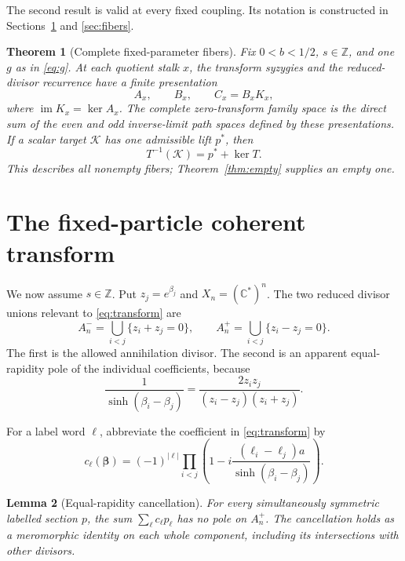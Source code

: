 \documentclass[11pt,reqno]{amsart}
\newtheorem{theorem}{Theorem}[section]
\newtheorem{lemma}[theorem]{Lemma}
\theoremstyle{definition}
\theoremstyle{remark}
\newcommand{\C}{\mathbb C}
\newcommand{\Z}{\mathbb Z}
\newcommand{\cK}{\mathcal K}
\newcommand{\im}{\operatorname{im}}
\begin{document}
The second result is valid at every fixed coupling.  Its notation is
constructed in Sections~\ref{sec:fixed} and \ref{sec:fibers}.

\begin{theorem}[Complete fixed-parameter fibers]
\label{thm:fibers-intro}
Fix $0<b<1/2$, $s\in\Z$, and one $g$ as in \eqref{eq:g}.  At each quotient
stalk $x$, the transform syzygies and the reduced-divisor recurrence have a
finite presentation
\begin{equation}
 A_x,\qquad B_x,\qquad C_x=B_xK_x,
 \label{eq:ABC-intro}
\end{equation}
where $\im K_x=\ker A_x$.  The complete zero-transform family space is the
direct sum of the even and odd inverse-limit path spaces defined by these
presentations.  If a scalar target $\cK$ has one admissible lift $p^*$, then
\begin{equation}
 T^{-1}(\cK)=p^*+\ker T.
 \label{eq:affine-intro}
\end{equation}
This describes all nonempty fibers; Theorem~\ref{thm:empty} supplies an empty
one.
\end{theorem}

\section{The fixed-particle coherent transform}
\label{sec:fixed}

We now assume $s\in\Z$.  Put $z_j=e^{\beta_j}$ and
$X_n=(\C^*)^n$.  The two reduced divisor unions relevant to
\eqref{eq:transform} are
\begin{equation}
 A_n^- =\bigcup_{i<j}\{z_i+z_j=0\},
 \qquad
 A_n^+ =\bigcup_{i<j}\{z_i-z_j=0\}.
 \label{eq:divisors}
\end{equation}
The first is the allowed annihilation divisor.  The second is an apparent
equal-rapidity pole of the individual coefficients, because
\begin{equation}
 \frac1{\sinh(\beta_i-\beta_j)}
 =\frac{2z_iz_j}{(z_i-z_j)(z_i+z_j)}.
 \label{eq:sinh-z}
\end{equation}

For a label word $\boldsymbol\ell$, abbreviate the coefficient in
\eqref{eq:transform} by
\begin{equation}
 c_{\boldsymbol\ell}(\boldsymbol\beta)
 =(-1)^{|\boldsymbol\ell|}
 \prod_{i<j}\left(1-i\frac{(\ell_i-\ell_j)a}
 {\sinh(\beta_i-\beta_j)}\right).
 \label{eq:row}
\end{equation}

\begin{lemma}[Equal-rapidity cancellation]
\label{lem:equal-cancel}
For every simultaneously symmetric labelled section $p$, the sum
$\sum_{\boldsymbol\ell}c_{\boldsymbol\ell}p_{\boldsymbol\ell}$ has no pole
on $A_n^+$.  The cancellation holds as a meromorphic identity on each whole
component, including its intersections with other divisors.
\end{lemma}
\end{document}

